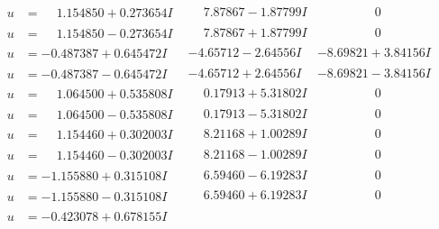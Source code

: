 \documentclass[1p]{elsarticle_modified}
\theoremstyle{definition}
\begin{document}
$$\begin{array}{c|c|c}
 \hline 
\begin{aligned}
u &= \phantom{-}1.154850 + 0.273654 I\end{aligned}
 & \phantom{-}7.87867 - 1.87799 I & \phantom{-0.000000 } 0 \\ \hline\begin{aligned}
u &= \phantom{-}1.154850 - 0.273654 I\end{aligned}
 & \phantom{-}7.87867 + 1.87799 I & \phantom{-0.000000 } 0 \\ \hline\begin{aligned}
u &= -0.487387 + 0.645472 I\end{aligned}
 & -4.65712 - 2.64556 I & -8.69821 + 3.84156 I \\ \hline\begin{aligned}
u &= -0.487387 - 0.645472 I\end{aligned}
 & -4.65712 + 2.64556 I & -8.69821 - 3.84156 I \\ \hline\begin{aligned}
u &= \phantom{-}1.064500 + 0.535808 I\end{aligned}
 & \phantom{-}0.17913 + 5.31802 I & \phantom{-0.000000 } 0 \\ \hline\begin{aligned}
u &= \phantom{-}1.064500 - 0.535808 I\end{aligned}
 & \phantom{-}0.17913 - 5.31802 I & \phantom{-0.000000 } 0 \\ \hline\begin{aligned}
u &= \phantom{-}1.154460 + 0.302003 I\end{aligned}
 & \phantom{-}8.21168 + 1.00289 I & \phantom{-0.000000 } 0 \\ \hline\begin{aligned}
u &= \phantom{-}1.154460 - 0.302003 I\end{aligned}
 & \phantom{-}8.21168 - 1.00289 I & \phantom{-0.000000 } 0 \\ \hline\begin{aligned}
u &= -1.155880 + 0.315108 I\end{aligned}
 & \phantom{-}6.59460 - 6.19283 I & \phantom{-0.000000 } 0 \\ \hline\begin{aligned}
u &= -1.155880 - 0.315108 I\end{aligned}
 & \phantom{-}6.59460 + 6.19283 I & \phantom{-0.000000 } 0 \\ \hline\begin{aligned}
u &= -0.423078 + 0.678155 I\end{aligned}

\end{array}$$
\end{document}
